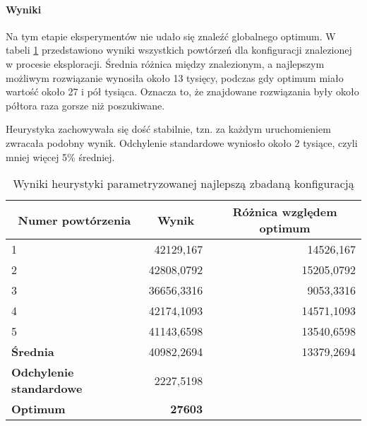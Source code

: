 \documentclass[./FM_mgr.tex]{subfiles}
\begin{document}
\paragraph{Wyniki}

Na tym etapie eksperymentów nie udało się znaleźć globalnego optimum.
W tabeli \ref{table:tsp_init_results} przedstawiono wyniki wszystkich powtórzeń dla konfiguracji znalezionej w procesie eksploracji.
Średnia różnica między znalezionym, a najlepszym możliwym rozwiązanie wynosiła około 13 tysięcy, podczas gdy optimum miało wartość około 27 i pół tysiąca.
Oznacza to, że znajdowane rozwiązania były około półtora raza gorsze niż poszukiwane.

Heurystyka zachowywała się dość stabilnie, tzn. za każdym uruchomieniem zwracała podobny wynik.
Odchylenie standardowe wyniosło około 2 tysiące, czyli mniej więcej 5\% średniej.

\begin{table}[h]
	\caption{Wyniki heurystyki parametryzowanej najlepszą zbadaną konfiguracją \label{table:tsp_init_results}}
	\centering
	\begin{tabular}{|l|r|r}
		\hline
		\multicolumn{1}{|c|}{{\bf Numer powtórzenia}} & \multicolumn{1}{c|}{{\bf Wynik}} & \multicolumn{1}{c|}{{\bf Różnica względem optimum}} \\ \hline \hline
		1                                             & 42129,167                        & \multicolumn{1}{r|}{14526,167}                      \\ \hline
		2                                             & 42808,0792                       & \multicolumn{1}{r|}{15205,0792}                     \\ \hline
		3                                             & 36656,3316                       & \multicolumn{1}{r|}{9053,3316}                      \\ \hline
		4                                             & 42174,1093                       & \multicolumn{1}{r|}{14571,1093}                     \\ \hline
		5                                             & 41143,6598                       & \multicolumn{1}{r|}{13540,6598}                     \\ \hline \hline
		{\bf Średnia}                                 & 40982,2694                      & \multicolumn{1}{r|}{13379,2694}                    \\ \hline
		{\bf Odchylenie standardowe}                  & 2227,5198                        &                       \\  \hhline{==~}
		{\bf Optimum}                                 & \multicolumn{1}{r|}{{\bf 27603}} & \multicolumn{1}{l}{}                                \\ \cline{1-2}
	\end{tabular}
\end{table}
\end{document}
